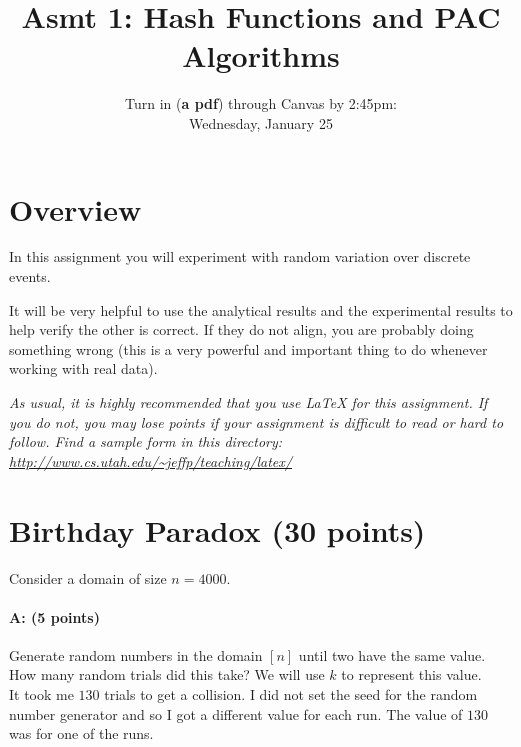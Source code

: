 \documentclass[11pt]{article}
\title{Asmt 1: Hash Functions and PAC Algorithms}
\author{Turn in (\textbf{a pdf}) through Canvas by 2:45pm: \\
Wednesday, January 25}
\date{}
\begin{document}
\maketitle






\section*{Overview}

In this assignment you will experiment with random variation over discrete events.  


It will be very helpful to use the analytical results and the experimental results to help verify the other is correct.  If they do not align, you are probably doing something wrong (this is a very powerful and important thing to do whenever working with real data).  


\vspace{.1in}

\emph{As usual, it is highly recommended that you use LaTeX for this assignment.  If you do not, you may lose points if your assignment is difficult to read or hard to follow.  Find a sample form in this directory:
\url{http://www.cs.utah.edu/~jeffp/teaching/latex/}}

\section{Birthday Paradox (30 points)}

Consider a domain of size $n = 4000$.  

\paragraph{A: (5 points)}
Generate random numbers in the domain $[n]$ until two have the same value.  How many random trials did this take?  
We will use $k$ to represent this value. \\

It took me $130$ trials to get a collision. I did not set the seed for the random number generator and so I got a different value for each run. The value of $130$ was for one of the runs.
\end{document}
